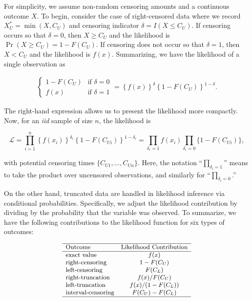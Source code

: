 \documentclass[]{book}
\theoremstyle{definition}
\theoremstyle{definition}
\theoremstyle{definition}
\theoremstyle{remark}
\begin{document}
For simplicity, we assume non-random censoring amounts and a continuous
outcome \(X\). To begin, consider the case of right-censored data where
we record \(X_U^{\ast}= \min(X, C_U)\) and censoring indicator
\(\delta= I(X \leq C_U)\). If censoring occurs so that \(\delta=0\),
then \(X \geq C_U\) and the likelihood is
\(\Pr(X \geq C_U) = 1-F(C_U)\). If censoring does not occur so that
\(\delta=1\), then \(X < C_U\) and the likelihood is \(f(x)\).
Summarizing, we have the likelihood of a single observation as

\[
\begin{aligned}
\left\{
\begin{array}{ll}
1-F(C_U) & \text{if }\delta=0 \\
f(x) & \text{if } \delta = 1 
\end{array}
\right. = \left\{ f(x)\right\}^{\delta} \left\{1-F(C_U)\right\}^{1-\delta} .
\end{aligned}
\]

The right-hand expression allows us to present the likelihood more
compactly. Now, for an \emph{iid} sample of size \(n\), the likelihood
is

\[
\mathcal{L} = 
\prod_{i=1}^n \left\{ f(x_i)\right\}^{\delta_i} \left\{1-F(C_{Ui})\right\}^{1-\delta_i} = \prod_{\delta_i=1} f(x_i) \prod_{\delta_i=0} \{1-F(C_{Ui})\},
\]

with potential censoring times \(\{ C_{U1}, \ldots,C_{Un} \}\). Here,
the notation ``\(\prod_{\delta_i=1}\)'' means to take the product over
uncensored observations, and similarly for ``\(\prod_{\delta_i=0}\).''

On the other hand, truncated data are handled in likelihood inference
via conditional probabilities. Specifically, we adjust the likelihood
contribution by dividing by the probability that the variable was
observed. To summarize, we have the following contributions to the
likelihood function for six types of outcomes:

\[
{\small
\begin{array}{lc}
\hline
\text{Outcome} & \text{Likelihood Contribution} \\
\hline 
\text{exact value} & f(x) \\
\text{right-censoring} & 1-F(C_U) \\
\text{left-censoring} & F(C_L) \\
\text{right-truncation} & f(x)/F(C_U) \\
\text{left-truncation} & f(x)/(1-F(C_L)) \\
\text{interval-censoring} & F(C_U)-F(C_L) \\
\hline
\end{array}
}
\]
\end{document}
